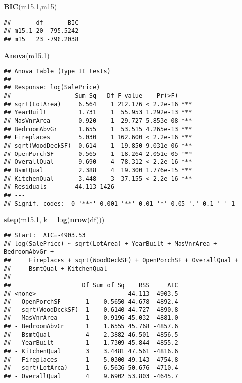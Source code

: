 \documentclass[
]{article}
\newenvironment{Shaded}{\begin{snugshade}}{\end{snugshade}}
\newcommand{\AttributeTok}[1]{\textcolor[rgb]{0.13,0.29,0.53}{#1}}
\newcommand{\FloatTok}[1]{\textcolor[rgb]{0.00,0.00,0.81}{#1}}
\newcommand{\FunctionTok}[1]{\textcolor[rgb]{0.13,0.29,0.53}{\textbf{#1}}}
\newcommand{\NormalTok}[1]{#1}
\begin{document}
\begin{Shaded}
\begin{Highlighting}[]
\FunctionTok{BIC}\NormalTok{(m15}\FloatTok{.1}\NormalTok{,m15)}
\end{Highlighting}
\end{Shaded}

\begin{verbatim}
##       df       BIC
## m15.1 20 -795.5242
## m15   23 -790.2038
\end{verbatim}

\begin{Shaded}
\begin{Highlighting}[]
\FunctionTok{Anova}\NormalTok{(m15}\FloatTok{.1}\NormalTok{)}
\end{Highlighting}
\end{Shaded}

\begin{verbatim}
## Anova Table (Type II tests)
## 
## Response: log(SalePrice)
##                  Sum Sq   Df F value    Pr(>F)    
## sqrt(LotArea)     6.564    1 212.176 < 2.2e-16 ***
## YearBuilt         1.731    1  55.953 1.292e-13 ***
## MasVnrArea        0.920    1  29.727 5.853e-08 ***
## BedroomAbvGr      1.655    1  53.515 4.265e-13 ***
## Fireplaces        5.030    1 162.600 < 2.2e-16 ***
## sqrt(WoodDeckSF)  0.614    1  19.850 9.031e-06 ***
## OpenPorchSF       0.565    1  18.264 2.051e-05 ***
## OverallQual       9.690    4  78.312 < 2.2e-16 ***
## BsmtQual          2.388    4  19.300 1.776e-15 ***
## KitchenQual       3.448    3  37.155 < 2.2e-16 ***
## Residuals        44.113 1426                      
## ---
## Signif. codes:  0 '***' 0.001 '**' 0.01 '*' 0.05 '.' 0.1 ' ' 1
\end{verbatim}

\begin{Shaded}
\begin{Highlighting}[]
\FunctionTok{step}\NormalTok{(m15}\FloatTok{.1}\NormalTok{, }\AttributeTok{k =} \FunctionTok{log}\NormalTok{(}\FunctionTok{nrow}\NormalTok{(df)))}
\end{Highlighting}
\end{Shaded}

\begin{verbatim}
## Start:  AIC=-4903.53
## log(SalePrice) ~ sqrt(LotArea) + YearBuilt + MasVnrArea + BedroomAbvGr + 
##     Fireplaces + sqrt(WoodDeckSF) + OpenPorchSF + OverallQual + 
##     BsmtQual + KitchenQual
## 
##                    Df Sum of Sq    RSS     AIC
## <none>                          44.113 -4903.5
## - OpenPorchSF       1    0.5650 44.678 -4892.4
## - sqrt(WoodDeckSF)  1    0.6140 44.727 -4890.8
## - MasVnrArea        1    0.9196 45.032 -4881.0
## - BedroomAbvGr      1    1.6555 45.768 -4857.6
## - BsmtQual          4    2.3882 46.501 -4856.5
## - YearBuilt         1    1.7309 45.844 -4855.2
## - KitchenQual       3    3.4481 47.561 -4816.6
## - Fireplaces        1    5.0300 49.143 -4754.8
## - sqrt(LotArea)     1    6.5636 50.676 -4710.4
## - OverallQual       4    9.6902 53.803 -4645.7
\end{verbatim}
\end{document}
